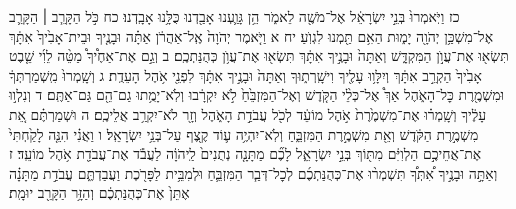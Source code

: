 \documentclass[twoside, openany, parskip=half, 11pt]{book}
\begin{document}
כז וַיֹּֽאמְרוּ֙ בְּנֵ֣י יִשְׂרָאֵ֔ל אֶל־מֹשֶׁ֖ה לֵאמֹ֑ר הֵ֥ן גָּוַ֛עְנוּ אָבַ֖דְנוּ כֻּלָּ֥נוּ אָבָֽדְנוּ׃ כח כֹּ֣ל הַקָּרֵ֧ב ׀ הַקָּרֵ֛ב אֶל־מִשְׁכַּ֥ן יְהֹוָ֖ה יָמ֑וּת הַאִ֥ם תַּ֖מְנוּ לִגְוֺֽעַ׃
יח א וַיֹּ֤אמֶר יְהֹוָה֙ אֶֽל־אַהֲרֹ֔ן אַתָּ֗ה וּבָנֶ֤יךָ וּבֵית־אָבִ֙יךָ֙ אִתָּ֔ךְ תִּשְׂא֖וּ אֶת־עֲוֺ֣ן הַמִּקְדָּ֑שׁ וְאַתָּה֙ וּבָנֶ֣יךָ אִתָּ֔ךְ תִּשְׂא֖וּ אֶת־עֲוֺ֥ן כְּהֻנַּתְכֶֽם׃ ב וְגַ֣ם אֶת־אַחֶ֩יךָ֩ מַטֵּ֨ה לֵוִ֜י שֵׁ֤בֶט אָבִ֙יךָ֙ הַקְרֵ֣ב אִתָּ֔ךְ וְיִלָּו֥וּ עָלֶ֖יךָ וִישָֽׁרְת֑וּךָ וְאַתָּה֙ וּבָנֶ֣יךָ אִתָּ֔ךְ לִפְנֵ֖י אֹ֥הֶל הָעֵדֻֽת׃ ג וְשָֽׁמְרוּ֙ מִֽשְׁמַרְתְּךָ֔ וּמִשְׁמֶ֖רֶת כׇּל־הָאֹ֑הֶל אַךְ֩ אֶל־כְּלֵ֨י הַקֹּ֤דֶשׁ וְאֶל־הַמִּזְבֵּ֙חַ֙ לֹ֣א יִקְרָ֔בוּ וְלֹֽא־יָמֻ֥תוּ גַם־הֵ֖ם גַּם־אַתֶּֽם׃ ד וְנִלְו֣וּ עָלֶ֔יךָ וְשָֽׁמְר֗וּ אֶת־מִשְׁמֶ֙רֶת֙ אֹ֣הֶל מוֹעֵ֔ד לְכֹ֖ל עֲבֹדַ֣ת הָאֹ֑הֶל וְזָ֖ר לֹא־יִקְרַ֥ב אֲלֵיכֶֽם׃ ה וּשְׁמַרְתֶּ֗ם אֵ֚ת מִשְׁמֶ֣רֶת הַקֹּ֔דֶשׁ וְאֵ֖ת מִשְׁמֶ֣רֶת הַמִּזְבֵּ֑חַ וְלֹֽא־יִהְיֶ֥ה ע֛וֹד קֶ֖צֶף עַל־בְּנֵ֥י יִשְׂרָאֵֽל׃ ו וַאֲנִ֗י הִנֵּ֤ה לָקַ֙חְתִּי֙ אֶת־אֲחֵיכֶ֣ם הַלְוִיִּ֔ם מִתּ֖וֹךְ בְּנֵ֣י יִשְׂרָאֵ֑ל לָכֶ֞ם מַתָּנָ֤ה נְתֻנִים֙ לַֽיהֹוָ֔ה לַעֲבֹ֕ד אֶת־עֲבֹדַ֖ת אֹ֥הֶל מוֹעֵֽד׃ ז וְאַתָּ֣ה וּבָנֶ֣יךָ אִ֠תְּךָ֠ תִּשְׁמְר֨וּ אֶת־כְּהֻנַּתְכֶ֜ם לְכׇל־דְּבַ֧ר הַמִּזְבֵּ֛חַ וּלְמִבֵּ֥ית לַפָּרֹ֖כֶת וַעֲבַדְתֶּ֑ם עֲבֹדַ֣ת מַתָּנָ֗ה אֶתֵּן֙ אֶת־כְּהֻנַּתְכֶ֔ם וְהַזָּ֥ר הַקָּרֵ֖ב יוּמָֽת׃
\end{document}

